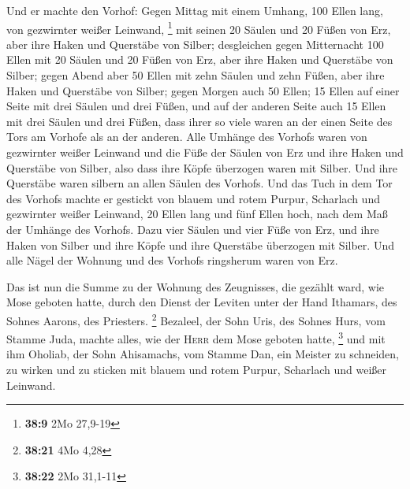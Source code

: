  Und er machte den Vorhof: Gegen Mittag mit einem Umhang,
100 Ellen lang, von gezwirnter weißer Leinwand, \footnote{\textbf{38:9}
  2Mo 27,9-19}  mit seinen 20 Säulen und 20 Füßen von
Erz, aber ihre Haken und Querstäbe von Silber; 
desgleichen gegen Mitternacht 100 Ellen mit 20 Säulen und 20 Füßen von
Erz, aber ihre Haken und Querstäbe von Silber;  gegen
Abend aber 50 Ellen mit zehn Säulen und zehn Füßen, aber ihre Haken und
Querstäbe von Silber;  gegen Morgen auch 50 Ellen;
 15 Ellen auf einer Seite mit drei Säulen und drei Füßen,
 und auf der anderen Seite auch 15 Ellen mit drei Säulen
und drei Füßen, dass ihrer so viele waren an der einen Seite des Tors am
Vorhofe als an der anderen.  Alle Umhänge des Vorhofs
waren von gezwirnter weißer Leinwand  und die Füße der
Säulen von Erz und ihre Haken und Querstäbe von Silber, also dass ihre
Köpfe überzogen waren mit Silber. Und ihre Querstäbe waren silbern an
allen Säulen des Vorhofs.  Und das Tuch in dem Tor des
Vorhofs machte er gestickt von blauem und rotem Purpur, Scharlach und
gezwirnter weißer Leinwand, 20 Ellen lang und fünf Ellen hoch, nach dem
Maß der Umhänge des Vorhofs.  Dazu vier Säulen und vier
Füße von Erz, und ihre Haken von Silber und ihre Köpfe und ihre
Querstäbe überzogen mit Silber.  Und alle Nägel der
Wohnung und des Vorhofs ringsherum waren von Erz.

 Das ist nun die Summe zu der Wohnung des Zeugnisses, die
gezählt ward, wie Mose geboten hatte, durch den Dienst der Leviten unter
der Hand Ithamars, des Sohnes Aarons, des Priesters. \footnote{\textbf{38:21}
  4Mo 4,28}  Bezaleel, der Sohn Uris, des Sohnes Hurs,
vom Stamme Juda, machte alles, wie der \textsc{Herr} dem Mose geboten
hatte, \footnote{\textbf{38:22} 2Mo 31,1-11}  und mit ihm
Oholiab, der Sohn Ahisamachs, vom Stamme Dan, ein Meister zu schneiden,
zu wirken und zu sticken mit blauem und rotem Purpur, Scharlach und
weißer Leinwand.

